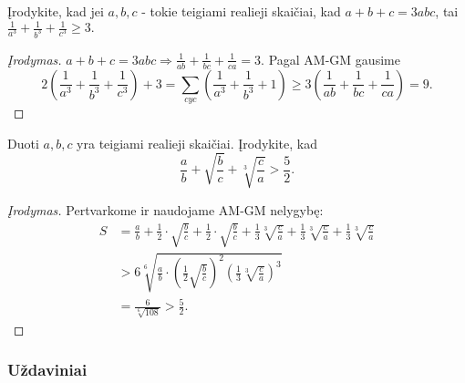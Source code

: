\begin{pavnr}
  Įrodykite, kad jei $a,b,c$ - tokie teigiami realieji skaičiai, kad
  $a+b+c=3abc$, tai $\frac{1}{a^3}+\frac{1}{b^3}+\frac{1}{c^3}\geq3.$
\end{pavnr}

\begin{proof}[Įrodymas]
  $a+b+c=3abc\Rightarrow\frac{1}{ab}+\frac{1}{bc}+\frac{1}{ca}=3.$ Pagal AM-GM gausime
  $$2\left(\frac{1}{a^3}+\frac{1}{b^3}+\frac{1}{c^3}\right)+3=\sum_{cyc}{\left(\frac{1}{a^3}+\frac{1}{b^3}+1\right)}\geq3\left(\frac{1}{ab}+\frac{1}{bc}+\frac{1}{ca}\right)=9.$$
\end{proof}

\begin{pavnr}
  Duoti $a,b,c$ yra teigiami realieji skaičiai. Įrodykite, kad
  $$\frac{a}{b}+\sqrt{\frac{b}{c}}+\sqrt[3]{\frac{c}{a}}>\frac{5}{2}.$$
\end{pavnr}

\begin{proof}[Įrodymas]
  Pertvarkome ir naudojame AM-GM nelygybę:
  \begin{align*}
    S & = \frac{a}{b} + \frac{1}{2} \cdot \sqrt{\frac{b}{c}} + \frac{1}{2}
    \cdot \sqrt{\frac{b}{c}} + \frac{1}{3} \sqrt[3]{\frac{c}{a}} +
    \frac{1}{3} \sqrt[3]{\frac{c}{a}} + \frac{1}{3} \sqrt[3]{\frac{c}{a}}\\
      & > 6\sqrt[6]{\frac{a}{b}\cdot\left(\frac{1}{2}\sqrt{\frac{b}{c}}\right)^2\left(\frac{1}{3}\sqrt[3]{\frac{c}{a}}\right)^3}\\
      & = \frac{6}{\sqrt[6]{108}}>\frac{5}{2}.
  \end{align*}
\end{proof}

\subsubsection{Uždaviniai}


